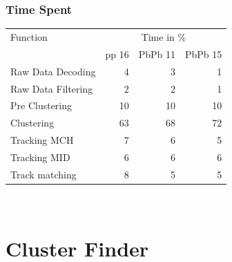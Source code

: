 \documentclass{beamer}
\begin{document}
\begin{frame}
  \frametitle{Time Spent}

\begin{tabular}{|l|r|r|r|}
  Function & \multicolumn{3}{c}{Time in \%} \\  
  & pp 16  & PbPb 11 & PbPb 15\\ \hline 
Raw Data Decoding & 4 & 3&1\\
Raw Data Filtering & 2 & 2&1\\
Pre Clustering & 10 & 10&10\\
Clustering & 63 & 68& 72\\
Tracking MCH & 7 & 6&5 \\
Tracking MID & 6 & 6&6 \\
Track matching & 8 &5 &5 \\
\end{tabular}\\
\vspace{2cm}
\end{frame}

\section{Cluster Finder}
\end{document}
